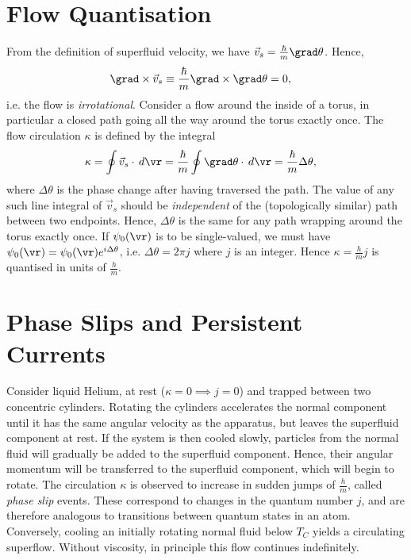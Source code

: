 \documentclass[a4paper, 11pt, normalem]{report}
\begin{document}
\section{Flow Quantisation}
From the definition of superfluid velocity, we have $\vec{v}_s = \frac{\hbar}{m}\grad\theta$.
Hence,
\begin{align}
    \grad\times\vec{v}_s &\equiv \frac{\hbar}{m}\grad\times\grad\theta=0,
\end{align}
i.e. the flow is \emph{irrotational}.
Consider a flow around the inside of a torus, in particular a closed path going all the way around the torus exactly once.
The flow circulation $\kappa$ is defined by the integral
\begin{align}
    \kappa &= \oint \vec{v}_s\cdot\,d\vr = \frac{\hbar}{m}\oint \grad\theta\cdot\,d\vr = \frac{\hbar}{m}\Delta\theta,
\end{align}
where $\Delta\theta$ is the phase change after having traversed the path.
The value of any such line integral of $\vec{v}_s$ should be \emph{independent} of the (topologically similar) path between two endpoints.
Hence, $\Delta\theta$ is the same for any path wrapping around the torus exactly once.
If $\psi_0(\vr)$ is to be single-valued, we must have $\psi_0(\vr)=\psi_0(\vr)e^{i\Delta\theta}$, i.e. $\Delta\theta=2\pi j$ where $j$ is an integer.
Hence $\kappa=\frac{h}{m}j$ is quantised in units of $\frac{h}{m}$.

\section{Phase Slips and Persistent Currents}
Consider liquid Helium, at rest ($\kappa=0\implies j=0$) and trapped between two concentric cylinders.
Rotating the cylinders accelerates the normal component until it has the same angular velocity as the apparatus, but leaves the superfluid component at rest.
If the system is then cooled slowly, particles from the normal fluid will gradually be added to the superfluid component.
Hence, their angular momentum will be transferred to the superfluid component, which will begin to rotate.
The circulation $\kappa$ is observed to increase in sudden jumps of $\frac{h}{m}$, called \emph{phase slip} events.
These correspond to changes in the quantum number $j$, and are therefore analogous to transitions between quantum states in an atom.
Conversely, cooling an initially rotating normal fluid below $T_C$ yields a circulating superflow.
Without viscosity, in principle this flow continues indefinitely.
\end{document}
